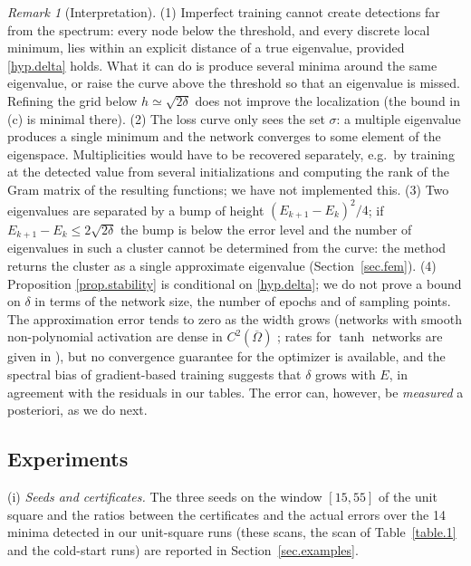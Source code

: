 \documentclass[10pt]{amsart}
\theoremstyle{definition}
\theoremstyle{remark}
\newtheorem{remark}{Remark}
\theoremstyle{plain}
\begin{document}
\begin{remark}[Interpretation]\label{rem.stability}
(1) Imperfect training cannot create detections far from the spectrum: every node below the
threshold, and every discrete local minimum, lies within an explicit distance of a true
eigenvalue, provided \eqref{hyp.delta} holds. What it can do is produce several minima around the
same eigenvalue, or raise the curve above the threshold so that an eigenvalue is missed. Refining the
grid below $h\simeq\sqrt{2\delta}$ does not improve the localization (the bound in (c) is minimal
there). (2) The loss curve only sees the set $\sigma$: a multiple eigenvalue produces a single
minimum and the network converges to some element of the eigenspace. Multiplicities would have to
be recovered separately, e.g.\ by training at the detected value from several initializations and
computing the rank of the Gram matrix of the resulting functions; we have not implemented this.
(3) Two eigenvalues are separated by a bump of height $(E_{k+1}-E_k)^2/4$; if
$E_{k+1}-E_k\le2\sqrt{2\delta}$ the bump is below the error level and the number of eigenvalues in
such a cluster cannot be determined from the curve: the method returns the cluster as a single
approximate eigenvalue (Section~\ref{sec.fem}). (4) Proposition \ref{prop.stability} is conditional
on \eqref{hyp.delta}; we do not prove a bound on $\delta$ in terms of the network size, the number of
epochs and of sampling points. The approximation error tends to zero as the width grows (networks
with smooth non-polynomial activation are dense in $C^2(\overline\Omega)$
\cite{Hornik1991,Pinkus1999}; rates for $\tanh$ networks are given in
\cite{DeRyck-Lanthaler-Mishra}), but no convergence guarantee for the optimizer is available, and the
spectral bias of gradient-based training \cite{Rahaman-etal} suggests that $\delta$ grows with $E$,
in agreement with the residuals in our tables. The error can, however, be \emph{measured} a
posteriori, as we do next.
\end{remark}

\subsection{Experiments}
(i) \emph{Seeds and certificates.} The three seeds on the window $[15,55]$ of the unit square and the
ratios between the certificates and the actual errors over the 14 minima detected in our unit-square
runs (these scans, the scan of Table~\ref{table.1} and the cold-start runs) are reported in
Section~\ref{sec.examples}.
\end{document}
